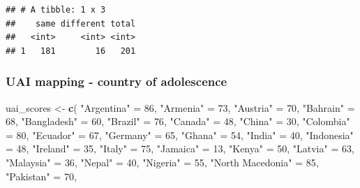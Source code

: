 \documentclass[
]{article}
\newenvironment{Shaded}{\begin{snugshade}}{\end{snugshade}}
\newcommand{\DecValTok}[1]{\textcolor[rgb]{0.00,0.00,0.81}{#1}}
\newcommand{\FunctionTok}[1]{\textcolor[rgb]{0.13,0.29,0.53}{\textbf{#1}}}
\newcommand{\NormalTok}[1]{#1}
\newcommand{\OtherTok}[1]{\textcolor[rgb]{0.56,0.35,0.01}{#1}}
\newcommand{\StringTok}[1]{\textcolor[rgb]{0.31,0.60,0.02}{#1}}
\begin{document}
\begin{verbatim}
## # A tibble: 1 x 3
##    same different total
##   <int>     <int> <int>
## 1   181        16   201
\end{verbatim}

\subsubsection{UAI mapping - country of
adolescence}\label{uai-mapping---country-of-adolescence}

\begin{Shaded}
\begin{Highlighting}[]
\NormalTok{uai\_scores }\OtherTok{\textless{}{-}} \FunctionTok{c}\NormalTok{(}
  \StringTok{"Argentina"}            \OtherTok{=} \DecValTok{86}\NormalTok{,}
  \StringTok{"Armenia"}              \OtherTok{=} \DecValTok{73}\NormalTok{,}
  \StringTok{"Austria"}              \OtherTok{=} \DecValTok{70}\NormalTok{,}
  \StringTok{"Bahrain"}              \OtherTok{=} \DecValTok{68}\NormalTok{,}
  \StringTok{"Bangladesh"}           \OtherTok{=} \DecValTok{60}\NormalTok{,}
  \StringTok{"Brazil"}               \OtherTok{=} \DecValTok{76}\NormalTok{,}
  \StringTok{"Canada"}               \OtherTok{=} \DecValTok{48}\NormalTok{,}
  \StringTok{"China"}                \OtherTok{=} \DecValTok{30}\NormalTok{,}
  \StringTok{"Colombia"}             \OtherTok{=} \DecValTok{80}\NormalTok{,}
  \StringTok{"Ecuador"}              \OtherTok{=} \DecValTok{67}\NormalTok{,}
  \StringTok{"Germany"}              \OtherTok{=} \DecValTok{65}\NormalTok{,}
  \StringTok{"Ghana"}                \OtherTok{=} \DecValTok{54}\NormalTok{,}
  \StringTok{"India"}                \OtherTok{=} \DecValTok{40}\NormalTok{,}
  \StringTok{"Indonesia"}            \OtherTok{=} \DecValTok{48}\NormalTok{,}
  \StringTok{"Ireland"}              \OtherTok{=} \DecValTok{35}\NormalTok{,}
  \StringTok{"Italy"}                \OtherTok{=} \DecValTok{75}\NormalTok{,}
  \StringTok{"Jamaica"}              \OtherTok{=} \DecValTok{13}\NormalTok{,}
  \StringTok{"Kenya"}                \OtherTok{=} \DecValTok{50}\NormalTok{,}
  \StringTok{"Latvia"}               \OtherTok{=} \DecValTok{63}\NormalTok{,}
  \StringTok{"Malaysia"}             \OtherTok{=} \DecValTok{36}\NormalTok{,}
  \StringTok{"Nepal"}                \OtherTok{=} \DecValTok{40}\NormalTok{,}
  \StringTok{"Nigeria"}              \OtherTok{=} \DecValTok{55}\NormalTok{,}
  \StringTok{"North Macedonia"}      \OtherTok{=} \DecValTok{85}\NormalTok{,}
  \StringTok{"Pakistan"}             \OtherTok{=} \DecValTok{70}\NormalTok{,}

\end{Highlighting}
\end{Shaded}
\end{document}
